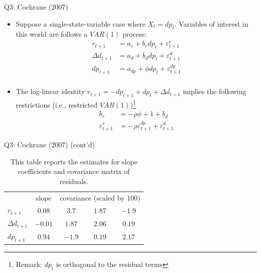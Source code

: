 \documentclass[10pt,t]{beamer}
\begin{document}
\begin{frame}{Q3: Cochrane (2007)}
\begin{itemize}
  \item Suppose a single-state-variable case where $X_{t} = dp_t$. Variables of interest in this world are follows a $VAR(1)$ process:
  \begin{equation*}
  \begin{split}
  r_{t+1} & = a_r + b_r dp_t + \varepsilon_{t+1}^r \\
  \Delta d_{t+1} & = a_d + b_d dp_t + \varepsilon_{t+1}^d \\
  dp_{t+1} & = a_{dp} + \phi dp_t + \varepsilon_{t+1}^{dp} \\
  \end{split}
  \end{equation*}
  \item The log-linear identity $r_{t+1} = - dp_{t+1} + dp_t + \Delta d_{t+1}$ implies the following restrictions (i.e., restricted $VAR(1)$)\footnote{Remark: $dp_t$ is orthogonal to the residual terms}
  \begin{equation*}
  \begin{split}
  b_r &= -\rho \phi + 1 + b_d \\
  \varepsilon_{t+1}^r &= -\rho\varepsilon_{t+1}^{dp} + \varepsilon_{t+1}^d
  \end{split}
  \end{equation*}
\end{itemize}
\end{frame}



\begin{frame}{Q3: Cochrane (2007) (cont'd)}
\vskip1.5cm
\begin{table}
\begin{tabular}{lcccc}
\toprule
& slope & \multicolumn{3}{c}{covariance (scaled by $100$)} \\
\cmidrule{1-5}
$r_{t+1}$ & $0.08$ & $3.7$ & $1.87$ & $-1.9$ \\
$\Delta d_{t+1}$ & $-0.01$ & $1.87$ & $2.06$ & $0.19$\\
$dp_{t+1}$ & $0.94$ & $-1.9$ & $0.19$ & $2.17$\\
\bottomrule
\end{tabular}
\caption{This table reports the estimates for slope coefficients and covariance matrix of residuals.}
\end{table}
\end{frame}
\end{document}
